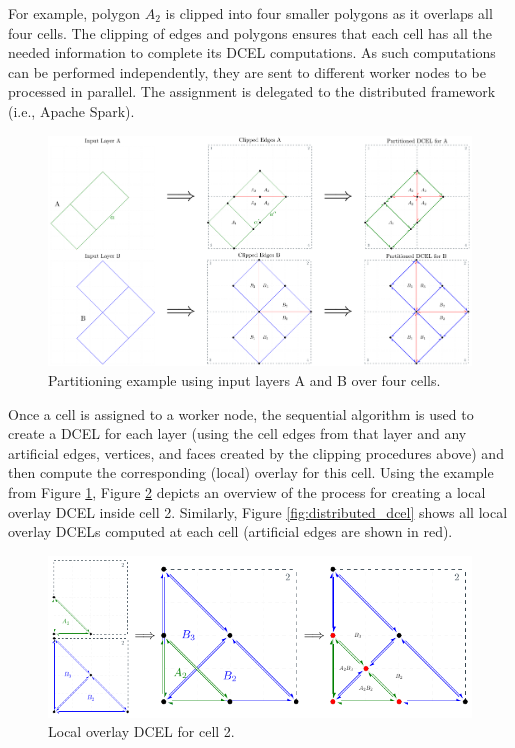 For example, polygon $A_2$ is clipped into four smaller polygons as it overlaps all four cells. The clipping of edges and polygons ensures that each cell has 
all the needed information to complete its DCEL computations. As such computations can be performed independently, they are sent to different worker nodes to be 
processed in parallel. The assignment is delegated to the distributed framework (i.e., Apache Spark). 

\begin{figure}
    \centering
    \includegraphics[width=\textwidth]{chapterSDCEL/polygons_parted}
    \caption{Partitioning example using input layers A and B over four cells.} \label{fig:partition_strategy}
\end{figure}

Once a cell is assigned to a worker node, the sequential algorithm is used to create a DCEL for each layer (using the cell edges from that layer and any 
artificial edges, vertices, and faces created by the clipping procedures above) and then compute the corresponding (local) overlay for this cell. Using the 
example from Figure \ref{fig:partition_strategy}, Figure \ref{fig:overlay_partition} depicts an overview of the process for creating a local overlay DCEL inside 
cell 2. Similarly, Figure \ref{fig:distributed_dcel} shows all local overlay DCELs computed at each cell (artificial edges are shown in red). 

\begin{figure}
    \centering
    \includegraphics[width=0.9\linewidth]{chapterSDCEL/overlay_partition.pdf}
    \caption{Local overlay DCEL for cell 2.}\label{fig:overlay_partition}
\end{figure}

